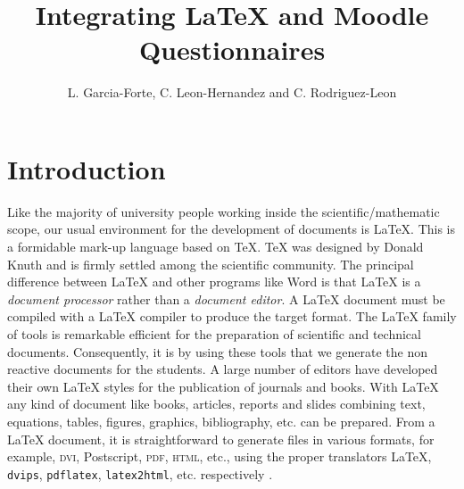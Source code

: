 \documentclass{pracjourn}[2006/02/20]
\title{Integrating LaTeX and Moodle Questionnaires}
\author{L. Garcia-Forte, C. Leon-Hernandez and C. Rodriguez-Leon}
\begin{document}
\maketitle



\section{Introduction}
\label{section:intro}
%

Like the majority of university people working inside the scientific/mathematic 
scope, our usual environment for the development of documents 
is \LaTeX{}. 
%
This is a formidable mark-up language based on \TeX{}. %
\TeX{} was designed by Donald Knuth and is firmly settled 
among the scientific community. 
The principal difference between \LaTeX{} and other programs like Word 
is that \LaTeX{} is a \emph{document processor} rather than a \emph{document editor}.
A \LaTeX{} document must be compiled with a \LaTeX{} compiler to produce
the target format.
The \LaTeX{} family of tools is remarkable efficient for the preparation 
of scientific and technical documents.
Consequently, it is by using these tools that we generate the non reactive 
documents for the students.
A large number of editors have developed their own \LaTeX{} styles for 
the publication of journals and books.
With \LaTeX{} any kind of document like books, articles, reports and slides 
combining text, equations, tables, figures, graphics, bibliography, etc.  
can be prepared. 
From a \LaTeX{} document, it is straightforward to generate files 
in various formats, for example, \textsc{dvi}, Postscript, \textsc{pdf}, \textsc{html}, etc., 
using the proper translators \LaTeX{}, \texttt{dvips}, \texttt{pdflatex}, \texttt{latex2html},
etc. respectively \cite{Dra:99}.
\end{document}
